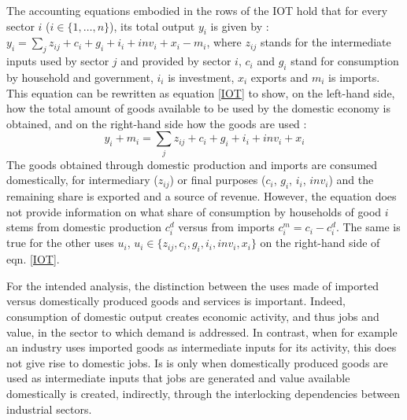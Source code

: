\documentclass[12pt,english]{article}
\begin{document}
The accounting equations embodied in the rows of the IOT hold that for every sector $i$ ($i \in \{1,\ldots,n\}$), its total output $y_i$ is given by : $y_i = \sum_j z_{ij} + c_i + g_i + i_i + inv_i + x_i - m_i$, where $z_{ij}$ stands for the intermediate inputs used by sector $j$ and provided by sector $i$, $c_i$ and $g_i$ stand for consumption by household and government, $i_i$ is investment, $x_i$ exports and $m_i$ is imports. This equation can be rewritten as equation \ref{IOT} to show, on the left-hand side, how the total amount of goods available to be used by the domestic economy is obtained, and on the right-hand side how the goods are used :  
\begin{equation}
y_i + m_i = \sum_j z_{ij} + c_i + g_i + i_i + inv_i + x_i \label{IOT}
\end{equation}
The goods obtained through domestic production and imports are consumed domestically, for intermediary ($z_{ij}$) or final  purposes ($c_i$, $g_i$, $i_i$, $inv_i$) and the remaining share is exported and a source of revenue. However, the equation does not provide information on what share of consumption by households of good $i$ stems from domestic production $c_i^d$ versus from imports $c_i^m = c_i - c_i^d$. The same is true for the other uses $u_i$, $u_i \in \{z_{ij}, c_i, g_i, i_i, inv_i, x_i\}$ on the right-hand side of eqn. \ref{IOT}. %

For the intended analysis, the distinction between the uses made of imported versus domestically produced goods and services is important. Indeed, consumption of domestic output creates economic activity, and thus jobs and value, in the sector to which demand is addressed. In contrast, when for example an industry uses imported goods as intermediate inputs for its activity, this does not give rise to domestic jobs. Is is only when domestically produced goods are used as intermediate inputs that jobs are generated and value available domestically is created, indirectly, through the interlocking dependencies between industrial sectors.

\end{document}
